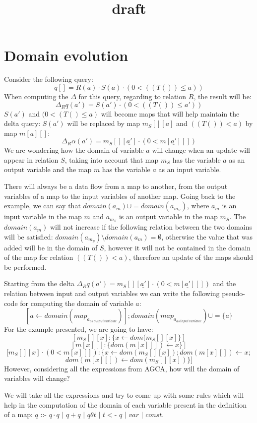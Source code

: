 \documentclass[12pt]{article}
\title{draft}
\date{}
\begin{document}
\section{Domain evolution}
Consider the following query:$$q[]=R(a)\cdot S(a)\cdot (0<((T())\le a))$$When computing the $\Delta$ for this query, regarding to relation $R$, the result will be: $$\Delta_{R}q (a') = S(a')\cdot (0<((T())\le a'))$$ $S(a')$ and $(0<(T()\le a)$ will become maps that will help maintain the delta query: $S(a')$ will be replaced by map $m_{S}[][a]$ and $((T())<a)$ by map $m[a][]$: $$\Delta_{R}\alpha(a') = m_{S}[][\underline{a'}] \cdot (0<m[\underline{a'}][])$$We are wondering how the domain of variable $a$ will change when an update will appear in relation $S$, taking into account that map $m_{S}$ has the variable $a$ as an output variable and the map $m$ has the variable $a$ as an input variable.

There will always be a data flow from a map to another, from the output variables of a map to the input variables of another map. Going back to the example, we can say that $domain(a_{m})\cup = domain(a_{m_{S}})$, where $a_{m}$ is an input variable in the map $m$ and $a_{m_{S}}$ is an output variable in the map $m_{S}$. The $domain(a_{m})$ will not increase if the following relation between the two domains will be satisfied: $domain(a_{m_{S}}) \setminus domain(a_{m}) = \emptyset$, otherwise the value that was added will be in the domain of $S$, however it will not be contained in the domain of the map for relation $((T())<a)$, therefore an update of the maps should be performed.

Starting from the delta $\Delta_{R}q(a') = m_{S}[][\underline{a'}] \cdot (0<m[\underline{a'}][])$ and the relation between input and output variables we can write the following pseudo-code for computing the domain of variable $a$: $$[a \gets domain(map_{a_{as\,output\,variable}})]; domain(map_{a_{as\,input\,variable}}) \cup = \{a\}$$For the example presented, we are going to have: $$[m_{S}[][x]: \{x \gets dom(m_{S}[][x]\}]$$ $$[m[x][]:\{dom(m[x][])\gets x \}]$$ $$[m_{S}[][x]\cdot (0<m[x][]): \{x \gets dom(m_{S}[][x]);dom(m[x][])\gets x;$$ $$dom(m[x][])\gets dom(m_{S}[][x]) \}]$$However, considering all the expressions from AGCA, how will the domain of variables will change?

We will take all the expressions and try to come up with some rules which will help in the computation of the domain of each variable present in the definition of a map: $q$ ::- $q \cdot q$ $|$ $q + q$ $|$ $q \theta t$ $|$ $t <$- $q$ $|$ $var$ $|$ $const$.
\end{document}

